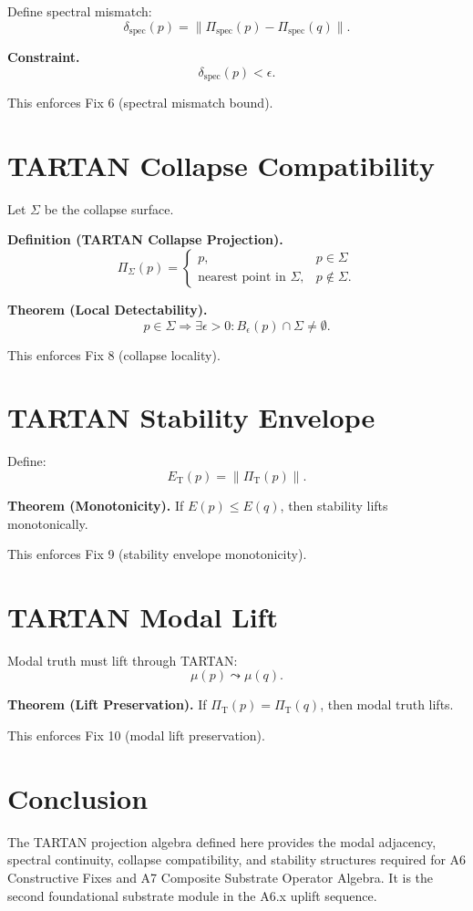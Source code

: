 \documentclass[11pt]{article}
\begin{document}
Define spectral mismatch:
\[
\delta_{\mathrm{spec}}(p) = \|\Pi_{\mathrm{spec}}(p) - \Pi_{\mathrm{spec}}(q)\|.
\]

\textbf{Constraint.}
\[
\delta_{\mathrm{spec}}(p) < \epsilon.
\]

This enforces Fix 6 (spectral mismatch bound).

\section{TARTAN Collapse Compatibility}

Let $\Sigma$ be the collapse surface.

\textbf{Definition (TARTAN Collapse Projection).}
\[
\Pi_{\Sigma}(p) = 
\begin{cases}
p, & p \in \Sigma \\
\text{nearest point in } \Sigma, & p \notin \Sigma.
\end{cases}
\]

\textbf{Theorem (Local Detectability).}
\[
p \in \Sigma \Rightarrow \exists \epsilon > 0 :
B_\epsilon(p) \cap \Sigma \neq \emptyset.
\]

This enforces Fix 8 (collapse locality).

\section{TARTAN Stability Envelope}

Define:
\[
E_{\mathrm{T}}(p) = \|\Pi_{\mathrm{T}}(p)\|.
\]

\textbf{Theorem (Monotonicity).}
If $E(p) \le E(q)$, then stability lifts monotonically.

This enforces Fix 9 (stability envelope monotonicity).

\section{TARTAN Modal Lift}

Modal truth must lift through TARTAN:
\[
\mu(p) \leadsto \mu(q).
\]

\textbf{Theorem (Lift Preservation).}
If $\Pi_{\mathrm{T}}(p) = \Pi_{\mathrm{T}}(q)$, then modal truth lifts.

This enforces Fix 10 (modal lift preservation).

\section{Conclusion}

The TARTAN projection algebra defined here provides the modal adjacency,
spectral continuity, collapse compatibility, and stability structures required
for A6 Constructive Fixes and A7 Composite Substrate Operator Algebra. It is
the second foundational substrate module in the A6.x uplift sequence.
\end{document}

